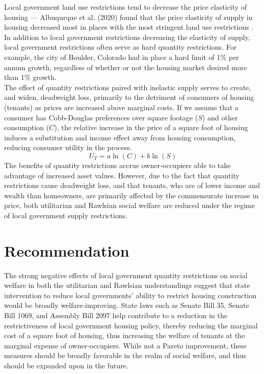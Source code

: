\documentclass[12pt]{extarticle}
\begin{document}
  Local government land use restrictions tend to decrease the price elasticity of housing --- Albuqurque et al. (2020) found that the price elasticity of supply in housing decreased most in places with the most stringent land use restrictions \cite{albuquerque_2020}. In addition to local government restrictions decreasing the elasticity of supply, local government restrictions often serve as hard quantity restrictions. For example, the city of Boulder, Colorado had in place a hard limit of 1\% per annum growth, regardless of whether or not the housing market desired more than 1\% growth.\\

  The effect of quantity restrictions paired with inelastic supply serves to create, and widen, deadweight loss, primarily to the detriment of consumers of housing (tenants) as prices are increased above marginal costs. If we assume that a consumer has Cobb-Douglas preferences over square footage ($S$) and other consumption ($C$), the relative increase in the price of a square foot of housing induces a substitution and income effect away from housing consumption, reducing consumer utility in the process.
  \[U_{T} = a\ln(C) + b\ln(S)\]
  The benefits of quantity restrictions accrue owner-occupiers able to take advantage of increased asset values. However, due to the fact that quantity restrictions cause deadweight loss, and that tenants, who are of lower income and wealth than homeowners, are primarily affected by the commensurate increase in price, both utilitarian and Rawlsian social welfare are reduced under the regime of local government supply restrictions.
  \section*{Recommendation}%
  The strong negative effects of local government quantity restrictions on social welfare in both the utilitarian and Rawlsian understandings suggest that state intervention to reduce local governments' ability to restrict housing construction would be broadly welfare-improving. State laws such as Senate Bill 35, Senate Bill 1069, and Assembly Bill 2097 help contribute to a reduction in the restrictiveness of local government housing policy, thereby reducing the marginal cost of a square foot of housing, thus increasing the welfare of tenants at the marginal expense of owner-occupiers. While not a Pareto improvement, these measures should be broadly favorable in the realm of social welfare, and thus should be expanded upon in the future.
  \printbibliography
\end{document}
